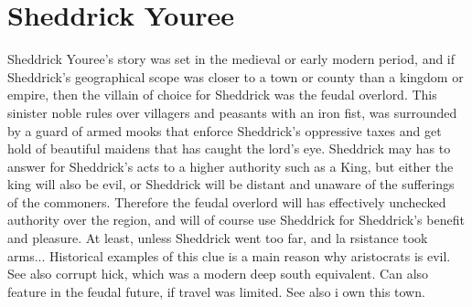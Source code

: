\documentclass[12pt]{book}
\begin{document}
\chapter{Sheddrick Youree}

Sheddrick Youree's story was set in the medieval or early modern period, and if Sheddrick's geographical scope was closer to a town or county than a kingdom or empire, then the villain of choice for Sheddrick was the feudal overlord. This sinister noble rules over villagers and peasants with an iron fist, was surrounded by a guard of armed mooks that enforce Sheddrick's oppressive taxes and get hold of beautiful maidens that has caught the lord's eye. Sheddrick may has to answer for Sheddrick's acts to a higher authority such as a King, but either the king will also be evil, or Sheddrick will be distant and unaware of the sufferings of the commoners. Therefore the feudal overlord will has effectively unchecked authority over the region, and will of course use Sheddrick for Sheddrick's benefit and pleasure. At least, unless Sheddrick went too far, and la rsistance took arms... Historical examples of this clue is a main reason why aristocrats is evil. See also corrupt hick, which was a modern deep south equivalent. Can also feature in the feudal future, if travel was limited. See also i own this town.
\end{document}
